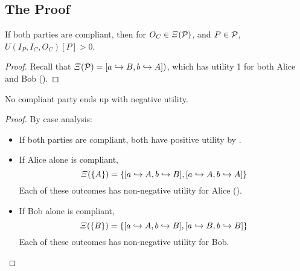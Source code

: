 \subsection{The Proof}

\begin{lemma}[Liveness]
  If both parties are compliant,
  then for $O_C \in \Xi({\mathcal P})$, 
  and $P \in {\mathcal P}$,
  $U(I_P,I_C,O_C)[P] > 0$.
\end{lemma}
\begin{proof}
  Recall that $\Xi({\mathcal P}) = [a \hookrightarrow B, b \hookrightarrow A])$,
  which has utility 1 for both Alice and Bob ().
\end{proof}

\begin{lemma}[Safety]
  No compliant party ends up with negative utility.
\end{lemma}
\begin{proof} 
By case analysis:
\begin{itemize}
\item
  If both parties are compliant,
  both have positive utility by .

\item
  If Alice alone is compliant,
  \begin{equation*}
    \Xi(\left\{ A \right\}) = \left\{ 
      [a \hookrightarrow A, b \hookrightarrow B],
      [a \hookrightarrow A, b \hookrightarrow A]
     \right\}
  \end{equation*}
  Each of these outcomes has non-negative utility for Alice ().

\item
  If Bob alone is compliant,
  \begin{equation*}
    \Xi(\left\{ B \right\}) = \left\{ 
      [a \hookrightarrow A, b \hookrightarrow B],
      [a \hookrightarrow B, b \hookrightarrow B] \right\}
  \end{equation*}
  Each of these outcomes has non-negative utility for Bob.
\end{itemize}    
\end{proof}

